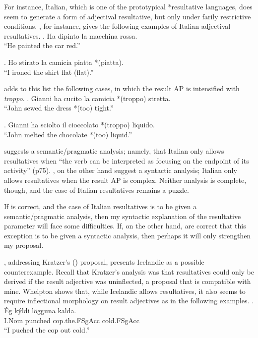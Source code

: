 \documentclass[MilwayThesis]{subfiles}
\begin{document}
For instance, Italian, which is one of the prototypical *resultative languages, does seem to generate a form of adjectival resultative, but only under farily restrictive conditions.
\textcite{napoli1992secondary}, for instance, gives the following examples of Italian adjectival resultatives.
\ex. Ha dipinto la macchina rossa.\\
``He painted the car red.''

\ex. Ho stirato la camicia piatta *(piatta).\\
``I ironed the shirt flat (flat).''

\textcite{folli2005prepositions} adds to this list the following cases, in which the result AP is intensified with \textit{troppo}.
\ex. Gianni ha cucito la camicia *(troppo) stretta.\\
``John sewed the dress *(too) tight.''

\ex. Gianni ha sciolto il cioccolato *(troppo) liquido.\\
``John melted the chocolate *(too) liquid.''

\textcite{napoli1992secondary} suggests a semantic/pragmatic analysis; namely, that Italian only allows resultatives when ``the verb can be interpreted as focusing on the endpoint of its activity'' (p75).
\textcite{folli2005prepositions}, on the other hand suggest a syntactic analysis; Italian only allows resultatives when the result AP is complex.
Neither analysis is complete, though, and the case of Italian resultatives remains a puzzle.

If \citeauthor{napoli1992secondary} is correct, and the case of Italian resultatives is to be given a semantic/pragmatic analysis, then my syntactic explanation of the resultative parameter will face some difficulties.
If, on the other hand, \citeauthor{folli2005prepositions} are correct that this exception is to be given a syntactic analysis, then perhaps it will only strengthen my proposal.

\textcite{whelpton2007building}, addressing Kratzer's (\citeyear{kratzer2004building}) proposal, presents Icelandic as a possible counterexample. 
Recall that Kratzer's analysis was that resultatives could only be derived if the result adjective was uninflected, a proposal that is compatible with mine.
Whelpton shows that, while Icelandic allows resultatives, it also seems to require inflectional morphology on result adjectives as in the following examples.
\exg. \'Eg k\'yldi l\"ogguna kalda.\\
I.Nom punched cop.the.FSgAcc cold.FSgAcc\\
``I puched the cop out cold.''
\end{document}
